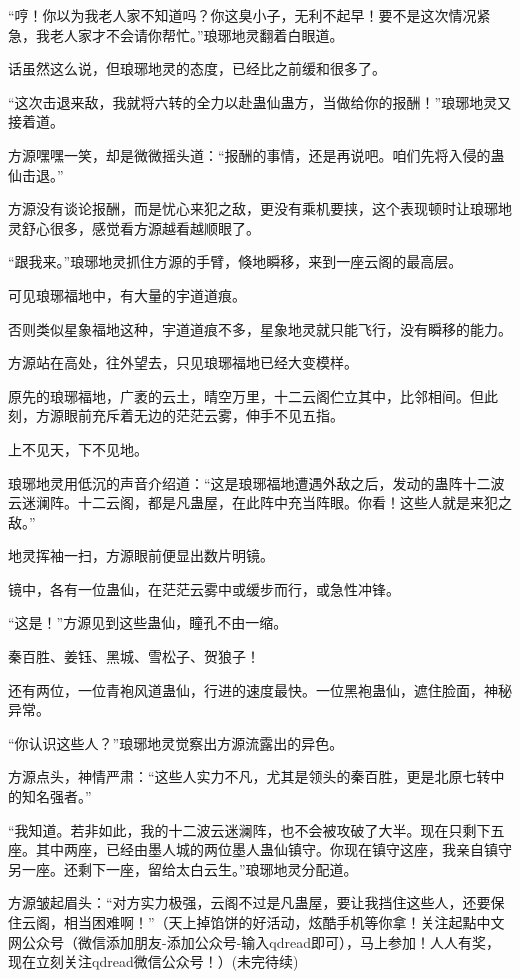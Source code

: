 \begin{this_body}
“哼！你以为我老人家不知道吗？你这臭小子，无利不起早！要不是这次情况紧急，我老人家才不会请你帮忙。”琅琊地灵翻着白眼道。

话虽然这么说，但琅琊地灵的态度，已经比之前缓和很多了。

“这次击退来敌，我就将六转的全力以赴蛊仙蛊方，当做给你的报酬！”琅琊地灵又接着道。

方源嘿嘿一笑，却是微微摇头道：“报酬的事情，还是再说吧。咱们先将入侵的蛊仙击退。”

方源没有谈论报酬，而是忧心来犯之敌，更没有乘机要挟，这个表现顿时让琅琊地灵舒心很多，感觉看方源越看越顺眼了。

“跟我来。”琅琊地灵抓住方源的手臂，倏地瞬移，来到一座云阁的最高层。

可见琅琊福地中，有大量的宇道道痕。

否则类似星象福地这种，宇道道痕不多，星象地灵就只能飞行，没有瞬移的能力。

方源站在高处，往外望去，只见琅琊福地已经大变模样。

原先的琅琊福地，广袤的云土，晴空万里，十二云阁伫立其中，比邻相间。但此刻，方源眼前充斥着无边的茫茫云雾，伸手不见五指。

上不见天，下不见地。

琅琊地灵用低沉的声音介绍道：“这是琅琊福地遭遇外敌之后，发动的蛊阵十二波云迷澜阵。十二云阁，都是凡蛊屋，在此阵中充当阵眼。你看！这些人就是来犯之敌。”

地灵挥袖一扫，方源眼前便显出数片明镜。

镜中，各有一位蛊仙，在茫茫云雾中或缓步而行，或急性冲锋。

“这是！”方源见到这些蛊仙，瞳孔不由一缩。

秦百胜、姜钰、黑城、雪松子、贺狼子！

还有两位，一位青袍风道蛊仙，行进的速度最快。一位黑袍蛊仙，遮住脸面，神秘异常。

“你认识这些人？”琅琊地灵觉察出方源流露出的异色。

方源点头，神情严肃：“这些人实力不凡，尤其是领头的秦百胜，更是北原七转中的知名强者。”

“我知道。若非如此，我的十二波云迷澜阵，也不会被攻破了大半。现在只剩下五座。其中两座，已经由墨人城的两位墨人蛊仙镇守。你现在镇守这座，我亲自镇守另一座。还剩下一座，留给太白云生。”琅琊地灵分配道。

方源皱起眉头：“对方实力极强，云阁不过是凡蛊屋，要让我挡住这些人，还要保住云阁，相当困难啊！”（天上掉馅饼的好活动，炫酷手机等你拿！关注起點中文网公众号（微信添加朋友-添加公众号-输入qdread即可），马上参加！人人有奖，现在立刻关注qdread微信公众号！）(未完待续)

\end{this_body}

